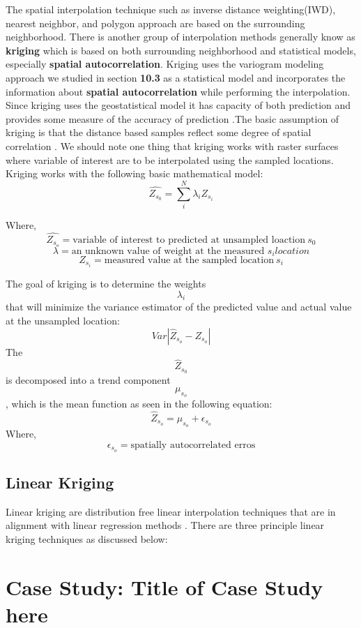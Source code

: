 \documentclass[
]{book}
\begin{document}
The spatial interpolation technique such as inverse distance weighting(IWD), nearest neighbor, and polygon approach are based on the surrounding neighborhood. There is another group of interpolation methods generally know as \textbf{kriging} \citep{krige_statistical_1951} which is based on both surrounding neighborhood and statistical models, especially \textbf{spatial autocorrelation}. Kriging uses the variogram modeling approach we studied in section \textbf{10.3} as a statistical model and incorporates the information about \textbf{spatial autocorrelation} while performing the interpolation. Since kriging uses the geostatistical model it has capacity of both prediction and provides some measure of the accuracy of prediction \citep{goovaerts_kriging_2008}.The basic assumption of kriging is that the distance based samples reflect some degree of spatial correlation \citep{goovaerts_kriging_2008}. We should note one thing that kriging works with raster surfaces where variable of interest are to be interpolated using the sampled locations. Kriging works with the following basic mathematical model:
\[\hat{Z_{s_0}}=\sum_{i}^N \lambda_{i}Z_{s_i}\]

Where, \[\hat{Z_{s_o}}=\text{variable of interest to predicted at unsampled loaction}\ s_0 \]
\[ \lambda=\text{an unknown value of weight at the measured } s_{i} location\]
\[Z_{s_i}=\text{measured value at the sampled location} \ s_i\]

The goal of kriging is to determine the weights \[\lambda_i\] that will minimize the variance estimator of the predicted value and actual value at the unsampled location:
\[ Var|\hat{Z}_{s_o}-Z_{s_o}|\]
The \[\hat{Z}_{s_0}\] is decomposed into a trend component \[\mu_{s_o}\], which is the mean function as seen in the following equation:
\[\hat{Z}_{s_o} = \mu_{s_o} + \epsilon_{s_o}\]
Where,\\
\[\epsilon_{s_o} = \text{spatially autocorrelated erros}\]

\hypertarget{linear-kriging}{%
\subsection{Linear Kriging}\label{linear-kriging}}

Linear kriging are distribution free linear interpolation techniques that are in alignment with linear regression methods \citep{asa_comparison_2012}. There are three principle linear kriging techniques as discussed below:

\hypertarget{case-study-title-of-case-study-here-3}{%
\section{Case Study: Title of Case Study here}\label{case-study-title-of-case-study-here-3}}
\end{document}
